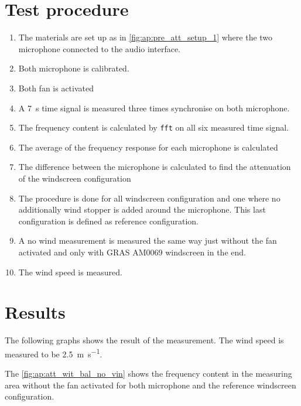 \section*{Test procedure}


\begin{enumerate}
\item The materials are set up as in \autoref{fig:ap:pre_att_setup_1} where the two microphone connected to the audio interface.
\item Both microphone is calibrated.
\item Both fan is activated 
\item A \SI{7}{\second} time signal is measured three times synchronise on both microphone.
\item The frequency content is calculated by \texttt{fft} on all six measured time signal.
\item The average of the frequency response for each microphone is calculated
\item The difference between the microphone is calculated to find the attenuation of the windscreen configuration
\item The procedure is done for all windscreen configuration and one where no additionally wind stopper is added around the microphone. This last configuration is defined as reference configuration.
\item A no wind measurement is measured the same way just without the fan activated and only with GRAS AM0069 windscreen in the end.
\item The wind speed is measured.
\end{enumerate}

\section*{Results}

The following graphs shows the result of the measurement. The wind speed is measured to be \SI{2.5}{\meter\per\second}. 




The \autoref{fig:ap:att_wit_bal_no_vin} shows the frequency content in the measuring area without the fan activated for both microphone and the reference windscreen configuration.



